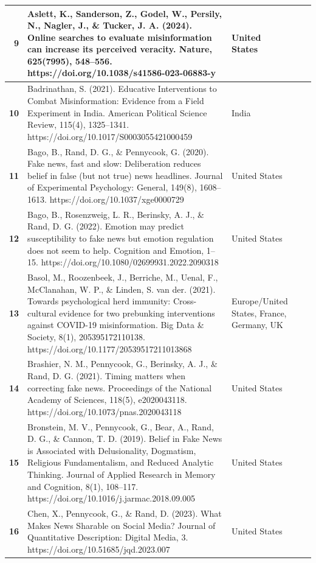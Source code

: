 \documentclass[
  doc,floatsintext]{apa6}
\begin{document}
\begin{longtable}[t]{>{}r||>{\raggedright\arraybackslash}p{20em}|>{\raggedright\arraybackslash}p{7em}|>{\raggedleft\arraybackslash}p{5em}|>{\raggedleft\arraybackslash}p{5em}}
\hline
\textbf{9} & Aslett, K., Sanderson, Z., Godel, W., Persily, N., Nagler, J., \& Tucker, J. A. (2024). Online searches to evaluate misinformation can increase its perceived veracity. Nature, 625(7995), 548–556. https://doi.org/10.1038/s41586-023-06883-y & United States & 5 & 7838\\
\hline
\textbf{10} & Badrinathan, S. (2021). Educative Interventions to Combat Misinformation: Evidence from a Field Experiment in India. American Political Science Review, 115(4), 1325–1341. https://doi.org/10.1017/S0003055421000459 & India & 2 & 406\\
\hline
\textbf{11} & Bago, B., Rand, D. G., \& Pennycook, G. (2020). Fake news, fast and slow: Deliberation reduces belief in false (but not true) news headlines. Journal of Experimental Psychology: General, 149(8), 1608–1613. https://doi.org/10.1037/xge0000729 & United States & 3 & 561\\
\hline
\textbf{12} & Bago, B., Rosenzweig, L. R., Berinsky, A. J., \& Rand, D. G. (2022). Emotion may predict susceptibility to fake news but emotion regulation does not seem to help. Cognition and Emotion, 1–15. https://doi.org/10.1080/02699931.2022.2090318 & United States & 8 & 4347\\
\hline
\textbf{13} & Basol, M., Roozenbeek, J., Berriche, M., Uenal, F., McClanahan, W. P., \& Linden, S. van der. (2021). Towards psychological herd immunity: Cross-cultural evidence for two prebunking interventions against COVID-19 misinformation. Big Data \& Society, 8(1), 205395172110138. https://doi.org/10.1177/20539517211013868 & Europe/United States, France, Germany, UK & 11 & 3548\\
\hline
\textbf{14} & Brashier, N. M., Pennycook, G., Berinsky, A. J., \& Rand, D. G. (2021). Timing matters when correcting fake news. Proceedings of the National Academy of Sciences, 118(5), e2020043118. https://doi.org/10.1073/pnas.2020043118 & United States & 2 & 812\\
\hline
\textbf{15} & Bronstein, M. V., Pennycook, G., Bear, A., Rand, D. G., \& Cannon, T. D. (2019). Belief in Fake News is Associated with Delusionality, Dogmatism, Religious Fundamentalism, and Reduced Analytic Thinking. Journal of Applied Research in Memory and Cognition, 8(1), 108–117. https://doi.org/10.1016/j.jarmac.2018.09.005 & United States & 2 & 948\\
\hline
\textbf{16} & Chen, X., Pennycook, G., \& Rand, D. (2023). What Makes News Sharable on Social Media? Journal of Quantitative Description: Digital Media, 3. https://doi.org/10.51685/jqd.2023.007 & United States & 2 & 5000\\

\end{longtable}
\end{document}

